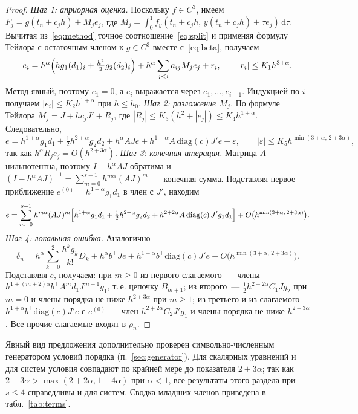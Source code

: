 \documentclass[11pt,a4paper]{article}
\theoremstyle{plain}
\theoremstyle{definition}
\newcommand{\dd}{\,\mathrm{d}}
\begin{document}
\begin{proof}
\emph{Шаг 1: априорная оценка.} Поскольку $f\in C^3$, имеем $F_j=g(t_n+c_jh)+M_je_j$, где $M_j=\int_0^1f_y(t_n+c_jh,\,y(t_n+c_jh)+\tau e_j)\dd\tau$. Вычитая из~\eqref{eq:method} точное соотношение~\eqref{eq:split} и применяя формулу Тейлора с остаточным членом к $g\in C^3$ вместе с~\eqref{eq:beta}, получаем
\[
e_i=h^{\alpha}\Bigl(h g_1(d_1)_i+\tfrac{h^2}{2}g_2(d_2)_i\Bigr)+h^{\alpha}\sum_{j<i}a_{ij}M_je_j+r_i,\qquad |r_i|\le K_1h^{3+\alpha}.
\]
Метод явный, поэтому $e_1=0$, а $e_i$ выражается через $e_1,\dots,e_{i-1}$. Индукцией по $i$ получаем $|e_i|\le K_2h^{1+\alpha}$ при $h\le h_0$.
\emph{Шаг 2: разложение $M_j$.} По формуле Тейлора $M_j=J+hc_jJ'+R_j$, где $|R_j|\le K_3(h^2+|e_j|)\le K_4h^{1+\alpha}$. Следовательно,
\[
e=h^{1+\alpha}g_1d_1+\tfrac12h^{2+\alpha}g_2d_2+h^{\alpha}AJe+h^{1+\alpha}A\,\mathrm{diag}(c)J'e+\varepsilon,\qquad |\varepsilon|\le K_5h^{\min(3+\alpha,\,2+3\alpha)},
\]
так как $h^{\alpha}R_je_j=O(h^{2+3\alpha})$.
\emph{Шаг 3: конечная итерация.} Матрица $A$ нильпотентна, поэтому $I-h^{\alpha}AJ$ обратима и $(I-h^{\alpha}AJ)^{-1}=\sum_{m=0}^{s-1}h^{m\alpha}(AJ)^m$~--- конечная сумма. Подставляя первое приближение $e^{(0)}=h^{1+\alpha}g_1d_1$ в член с $J'$, находим
\[
e=\sum_{m=0}^{s-1}h^{m\alpha}(AJ)^m\Bigl[h^{1+\alpha}g_1d_1+\tfrac12h^{2+\alpha}g_2d_2+h^{2+2\alpha}A\,\mathrm{diag}(c)\,J'g_1d_1\Bigr]+O\bigl(h^{\min(3+\alpha,\,2+3\alpha)}\bigr).
\]
\emph{Шаг 4: локальная ошибка.} Аналогично
\[
\delta_n=h^{\alpha}\sum_{k=0}^{2}\frac{h^kg_k}{k!}D_k+h^{\alpha}b^{\top}Je+h^{1+\alpha}b^{\top}\mathrm{diag}(c)J'e+O\bigl(h^{\min(3+\alpha,\,2+3\alpha)}\bigr).
\]
Подставляя $e$, получаем: при $m\ge0$ из первого слагаемого~--- члены $h^{1+(m+2)\alpha}b^{\top}A^md_1J^{m+1}g_1$, т.\,е. цепочку $B_{m+1}$; из второго~--- $\frac12h^{2+2\alpha}C_1Jg_2$ при $m=0$ и члены порядка не ниже $h^{2+3\alpha}$ при $m\ge1$; из третьего и из слагаемого $h^{1+\alpha}b^{\top}\mathrm{diag}(c)J'e$ с $e^{(0)}$~--- член $h^{2+2\alpha}C_2J'g_1$ и члены порядка не ниже $h^{2+3\alpha}$. Все прочие слагаемые входят в $\rho_n$.
\end{proof}

Явный вид предложения дополнительно проверен символьно-численным генератором условий порядка (п.~\ref{sec:generator}). Для скалярных уравнений и для систем условия совпадают по крайней мере до показателя $2+3\alpha$; так как $2+3\alpha>\max(2+2\alpha,1+4\alpha)$ при $\alpha<1$, все результаты этого раздела при $s\le4$ справедливы и для систем. Сводка младших членов приведена в табл.~\ref{tab:terms}.
\end{document}
